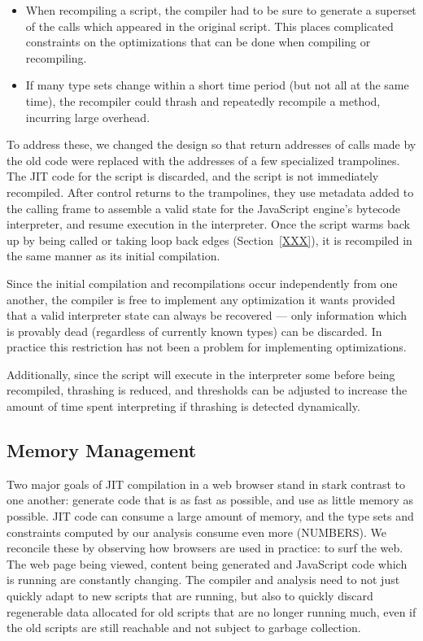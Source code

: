 \begin{itemize}

\item When recompiling a script, the compiler had to be sure to generate
a superset of the calls which appeared in the original script.
This places complicated constraints on the optimizations that
can be done when compiling or recompiling.

\item If many type sets change within a short time period (but not all at
the same time), the recompiler could thrash and repeatedly recompile a
method, incurring large overhead.

\end{itemize}

To address these, we changed the design so that return addresses of
calls made by the old code were replaced with the addresses of
a few specialized trampolines.
The JIT code for the script is discarded, and the script is not
immediately recompiled.
After control returns to the trampolines, they use metadata added to
the calling frame to assemble
a valid state for the JavaScript engine's bytecode interpreter,
and resume execution in the interpreter.
Once the script warms back up by being called or taking loop back edges
(Section~\ref{XXX}), it is recompiled in the same manner as its
initial compilation.

Since the initial compilation and recompilations occur independently
from one another, the compiler is free to implement any optimization it
wants provided that a valid interpreter state can always be recovered ---
only information which is provably dead (regardless of currently known types)
can be discarded.
In practice this restriction has not been a problem for
implementing optimizations.

Additionally, since the script will execute in the interpreter some before
being recompiled, thrashing is reduced, and thresholds can be adjusted to
increase the amount of time spent interpreting if thrashing is detected
dynamically.

\subsection{Memory Management}

Two major goals of JIT compilation in a web browser stand in stark contrast
to one another: generate code that is as fast as possible, and use as little
memory as possible.
JIT code can consume a large amount of memory, and the type sets and constraints
computed by our analysis consume even more (NUMBERS).
We reconcile these by observing how browsers are used in practice:
to surf the web.
The web page being viewed, content being generated and JavaScript code which
is running are constantly changing.
The compiler and analysis need to not just quickly adapt to new scripts that are
running, but also to quickly discard regenerable data allocated for
old scripts that are no longer running much, even if the old scripts are still
reachable and not subject to garbage collection.

